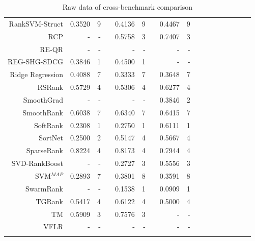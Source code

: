 \documentclass{sig-alternate-2013}
\begin{document}
\begin{longtable}{@{}rrrrrrrrrrrrrrrrr@{}}
RankSVM-Struct & 0.3520 & 9 && 0.4136 & 9 && 0.4467 & 9 && & && & & \\
RCP & - & - && 0.5758 & 3 && 0.7407 & 3 && & && & & \\
RE-QR & - & - && - & - && - & - && & && & & \\
REG-SHG-SDCG & 0.3846 & 1 && 0.4500 & 1 && - & - && & && & & \\
Ridge Regression & 0.4088 & 7 && 0.3333 & 7 && 0.3648 & 7 && & && & & \\
RSRank & 0.5729 & 4 && 0.5306 & 4 && 0.6277 & 4 && & && & & \\
SmoothGrad & - & - && - & - && 0.3846 & 2 && & && & & \\
SmoothRank & 0.6038 & 7 && 0.6340 & 7 && 0.6415 & 7 && & && & & \\
SoftRank & 0.2308 & 1 && 0.2750 & 1 && 0.6111 & 1 && & && & & \\
SortNet & 0.2500 & 2 && 0.5147 & 4 && 0.5667 & 4 && & && & & \\
SparseRank & 0.8224 & 4 && 0.8173 & 4 && 0.7944 & 4 && & && & & \\
SVD-RankBoost & - & - && 0.2727 & 3 && 0.5556 & 3 && & && & & \\
SVM$^{MAP}$ & 0.2893 & 7 && 0.3801 & 8 && 0.3591 & 8 && & && & & \\
SwarmRank & - & - && 0.1538 & 1 && 0.0909 & 1 && & && & & \\
TGRank & 0.5417 & 4 && 0.6122 & 4 && 0.5000 & 4 && & && & & \\
TM & 0.5909 & 3 && 0.7576 & 3 && - & - && & && & & \\
VFLR & - & - && - & - && - & - && & && & & \\
\bottomrule
\caption{Raw data of cross-benchmark comparison}
\label{tab:raw_data}
\end{longtable}
\end{document}
